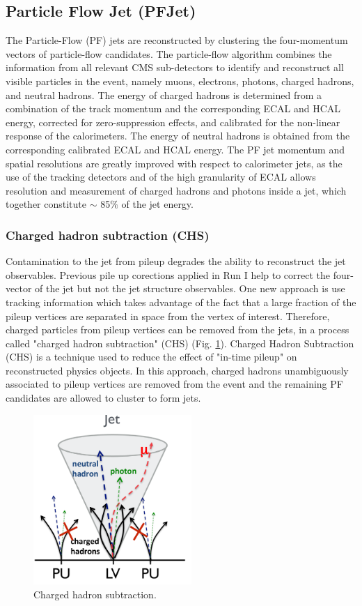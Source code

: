 \subsection{Particle Flow Jet (PFJet)}

The Particle-Flow (PF) jets are reconstructed by clustering the four-momentum vectors of particle-flow candidates. The particle-flow algorithm combines the information from all
relevant CMS sub-detectors to identify and reconstruct all visible particles in the event, namely muons, electrons, photons, charged hadrons, and neutral hadrons. The energy of charged hadrons is determined from a combination of the track momentum and the corresponding ECAL and HCAL energy, corrected for zero-suppression effects, and calibrated for the non-linear response of the calorimeters. The energy of neutral hadrons is obtained from the corresponding calibrated ECAL and HCAL energy. The PF jet momentum and spatial resolutions are greatly improved with respect to calorimeter jets, as the use of the tracking detectors and of the high granularity of ECAL allows resolution and measurement of charged hadrons and photons inside a jet, which together constitute $\sim$ 85$\%$ of the jet energy.

\subsubsection{Charged hadron subtraction (CHS)}

Contamination to the jet from pileup degrades the ability to reconstruct the jet observables. Previous pile up corections applied in Run I help to correct the four-vector of the jet but not
the jet structure observables. One new approach is use tracking information which takes advantage of the fact that a large fraction of the pileup vertices are separated in space from the vertex of interest. Therefore, charged particles from pileup vertices can be removed from the jets, in a process called "charged hadron subtraction" (CHS) (Fig. \ref{jetchsfigure}). Charged Hadron Subtraction (CHS) is a technique used to reduce the effect of "in-time pileup" on reconstructed physics objects. In this approach, charged hadrons unambiguously associated
to pileup vertices are removed from the event and the remaining PF candidates are allowed to cluster to form jets.
\begin{figure}[H]
  \centering
\includegraphics[width=6cm]{physics_objects_plots/chs}
\caption{Charged hadron subtraction. \label{jetchsfigure}}
\end{figure}

